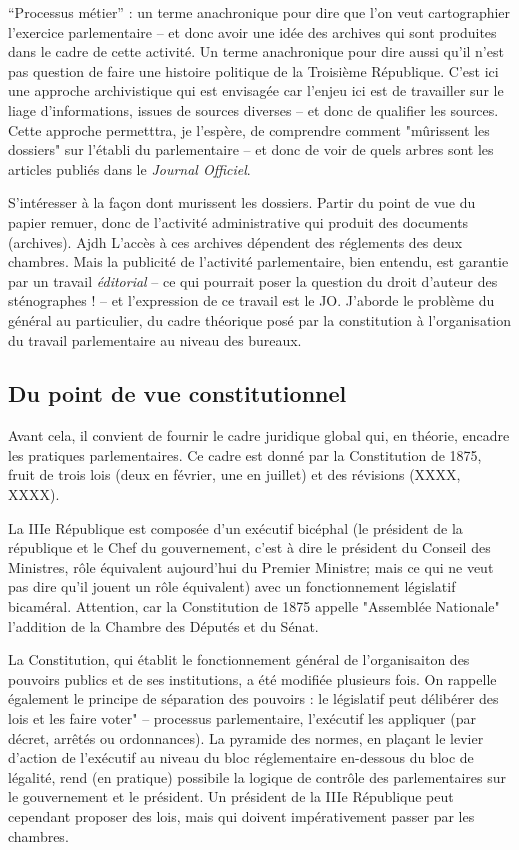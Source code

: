 \enquote{Processus métier} : un terme anachronique pour dire que l'on veut cartographier l'exercice parlementaire -- et donc avoir une idée des archives qui sont produites dans le cadre de cette activité. Un terme anachronique pour dire aussi qu'il n'est pas question de faire une histoire politique de la Troisième République. C'est ici une approche archivistique qui est envisagée car l'enjeu ici est de travailler sur le liage d'informations, issues de sources diverses -- et donc de qualifier les sources. Cette approche permetttra, je l'espère, de comprendre comment "mûrissent les dossiers" sur l'établi du parlementaire -- et donc de voir de quels arbres sont les articles publiés dans le \textit{Journal Officiel}.

S'intéresser à la façon dont murissent les dossiers. Partir du point de vue du papier remuer, donc de l'activité administrative qui produit des documents (archives). Ajdh L'accès à ces archives dépendent des réglements des deux chambres. Mais la publicité de l'activité parlementaire, bien entendu, est garantie par un travail \textit{éditorial} -- ce qui pourrait poser la question du droit d'auteur des sténographes ! -- et l'expression de ce travail est le JO. J'aborde le problème du général au particulier, du cadre théorique posé par la constitution à l'organisation du travail parlementaire au niveau des bureaux.

\subsection{Du point de vue constitutionnel}

Avant cela, il convient de fournir le cadre juridique global qui, en théorie, encadre les pratiques parlementaires. Ce cadre est donné par la Constitution de 1875, fruit de trois lois (deux en février, une en juillet) et des révisions (XXXX, XXXX).

La IIIe République est composée d'un exécutif bicéphal (le président de la république et le Chef du gouvernement, c'est à dire le président du Conseil des Ministres, rôle équivalent aujourd'hui du Premier Ministre; mais ce qui ne veut pas dire qu'il jouent un rôle équivalent) avec un fonctionnement législatif bicaméral. Attention, car la Constitution de 1875 appelle "Assemblée Nationale" l'addition de la Chambre des Députés et du Sénat.

La Constitution, qui établit le fonctionnement général de l'organisaiton des pouvoirs publics et de ses institutions, a été modifiée plusieurs fois. On rappelle également le principe de séparation des pouvoirs : le législatif peut délibérer des lois et les faire voter" -- processus parlementaire, l'exécutif les appliquer (par décret, arrêtés ou ordonnances). La pyramide des normes, en plaçant le levier d'action de l'exécutif au niveau du bloc réglementaire en-dessous du bloc de légalité, rend (en pratique) possibile la logique de contrôle des parlementaires sur le gouvernement et le président. Un président de la IIIe République peut cependant proposer des lois, mais qui doivent impérativement passer par les chambres.

